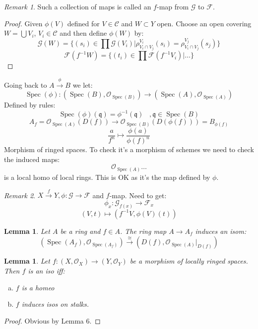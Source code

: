 \documentclass[12 pt]{article}
\newcommand{\fr}{\mathfrak}
\DeclareMathOperator{\Spec}{Spec}
\theoremstyle{plain}
\newtheorem{lem}[thm]{Lemma}
\theoremstyle{definition}
\theoremstyle{remark}
\newtheorem*{rem}{Remark}
\begin{document}
\begin{rem}
Such a collection of maps is called an $f$-map from $\mathcal{G}$ to $\mathcal{F}$.
\end{rem}
\begin{proof}
Given $\phi(V)$ defined for $V \in \mathcal{C}$ and $W \subset Y$ open. Choose an open covering $W = \bigcup V_i$, $V_i \in \mathcal{C}$ and then define $\phi(W)$ by:
\[       \mathcal{G} (W) = \{   (s_i) \in \prod \mathcal{G}(V_i) | \rho^{V_i}_{V_i \cap V_j} (s_i) = \rho^{V_j}_{V_i \cap V_j} (s_j)   \}       \]
\[       \mathcal{F} (f^{-1} W) =   \{   (t_i) \in \prod \mathcal{F}(f^{-1} V_i) |   \dots \}       \]
\end{proof}
Going back to $A \xrightarrow{\phi} B$ we let:
\[      \Spec(\phi) : (\Spec(B), \mathcal{O}_{\Spec(B)}) \to  (\Spec(A), \mathcal{O}_{\Spec(A)})    \]
Defined by rules:
\[      \Spec(\phi) (\fr q) = \phi^{-1}(\fr q) \;\;\;, \fr q \in \Spec(B)      \]
\[    A_f =   \mathcal{O}_{\Spec(A)}(D(f)) \to \mathcal{O}_{\Spec(B)} (D(\phi(f)))   = B_{\phi(f)}     \]
\[           \frac{a}{f^n} \mapsto \frac{\phi(a)}{\phi(f)^n}         \]
Morphism of ringed spaces. To check it's a morphism of schemes we need to check the induced maps:
\[       \mathcal{O}_{\Spec(A)}    \dots  \]
is a local homo of local rings. This is OK as it's the map defined by $\phi$.
\begin{rem}
$X \xrightarrow{f} Y , \phi : \mathcal{G} \to \mathcal{F}$ and $f$-map. Need to get:
\[      \phi_x : \mathcal{G}_{f(x)} \to \mathcal{F}_x       \]
\[       (V, t) \mapsto (f^{-1} V, \phi(V) (t))     \]
\end{rem}
\begin{lem}
Let $A$ be a ring and $f\in A$. The ring map $A \to A_f$ induces an isom:
\[         (\Spec(A_f), \mathcal{O}_{\Spec(A_f)}) \xrightarrow{\cong} (D(f), \mathcal{O}_{\Spec(A)}|_{D(f)})        \]
\end{lem}
\begin{lem}
Let $f: (X, \mathcal{O}_X) \to (Y, \mathcal{O}_Y)$ be a morphism of locally ringed spaces. Then $f$ is an iso iff:
\begin{enumerate} [(a)]
\item $f$ is a homeo
\item $f$ induces isos on stalks. 
\end{enumerate}
\end{lem}
\begin{proof}
Obvious by Lemma 6.
\end{proof}
\end{document}
